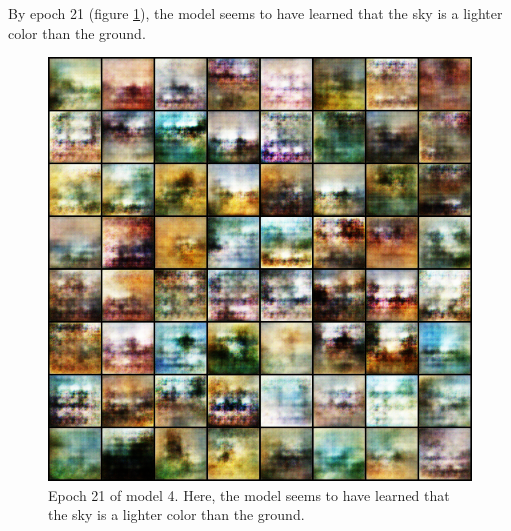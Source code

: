 \documentclass[11pt,letterpaper]{article}
\begin{document}
				By epoch 21 (figure \ref{fig:wa64:epoch021generator}), the model seems to have learned that the sky is a lighter color than the ground.
				\begin{figure}
					\centering
					\includegraphics[width=1.0\linewidth]{results/model4/epoch021_generator}
					\caption{Epoch 21 of model 4. Here, the model seems to have learned that the sky is a lighter color than the ground.}
					\label{fig:wa64:epoch021generator}
				\end{figure}
\end{document}
